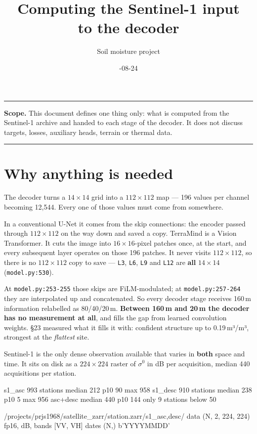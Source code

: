 \documentclass[10pt,a4paper]{article}
\title{\bfseries\sffamily Computing the Sentinel-1 input\\to the decoder}
\author{\sffamily Soil moisture project}
\date{\sffamily 2026-08-24}
\newcommand{\code}[1]{\texttt{\small #1}}
\begin{document}
\maketitle
\thispagestyle{fancy}
{\small\tableofcontents}
\medskip\hrule\medskip

\textbf{Scope.} This document defines one thing only: what is computed from the Sentinel-1
archive and handed to each stage of the decoder. It does not discuss targets, losses,
auxiliary heads, terrain or thermal data.

\medskip\hrule\medskip

\section{Why anything is needed}

The decoder turns a $14\times14$ grid into a $112\times112$ map --- 196 values per channel
becoming 12{,}544. Every one of those values must come from somewhere.

In a conventional U-Net it comes from the skip connections: the encoder passed through
$112\times112$ on the way down and saved a copy. TerraMind is a Vision Transformer. It cuts
the image into $16\times16$-pixel patches once, at the start, and every subsequent layer
operates on those 196 patches. It never visits $112\times112$, so there is no
$112\times112$ copy to save --- \code{L3}, \code{L6}, \code{L9} and \code{L12} are
\textbf{all} $14\times14$ (\code{model.py:530}).

At \code{model.py:253-255} those skips are FiLM-modulated; at \code{model.py:257-264} they
are interpolated up and concatenated. So every decoder stage receives 160\,m information
relabelled as 80/40/20\,m. \textbf{Between 160\,m and 20\,m the decoder has no measurement
at all}, and fills the gap from learned convolution weights. §23 measured what it fills it
with: confident structure up to 0.19\,m³/m³, strongest at the \emph{flattest} site.

Sentinel-1 is the only dense observation available that varies in \textbf{both} space and
time. It sits on disk as a $224\times224$ raster of $\sigma^0$ in dB per acquisition,
median 440 acquisitions per station.

\begin{blk}
   s1_asc   993 stations   median 212   p10  90   max 958
   s1_desc  910 stations   median 238   p10   5   max 956
   asc+desc                median 440   p10 144   only 9 stations below 50

   /projects/prjs1968/satellite_zarr/{station}.zarr/s1_{asc,desc}/
       data   (N, 2, 224, 224)  fp16, dB, bands [VV, VH]
       dates  (N,)              b'YYYYMMDD'
\end{blk}
\end{document}
